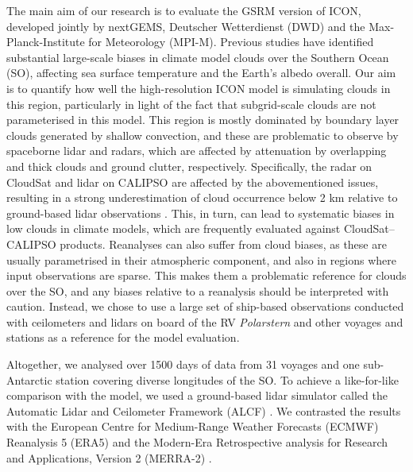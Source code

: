\documentclass[12pt,a4paper]{article}
\begin{document}
The main aim of our research is to evaluate the GSRM version of ICON, developed
jointly by nextGEMS, Deutscher Wetterdienst (DWD) and the Max-Planck-Institute
for Meteorology (MPI-M). Previous studies have identified substantial
large-scale biases in climate model clouds over the Southern Ocean (SO),
affecting sea surface temperature and the Earth’s albedo overall. Our aim is to
quantify how well the high-resolution ICON model is simulating clouds in this
region, particularly in light of the fact that subgrid-scale clouds are not
parameterised in this model. This region is mostly dominated by boundary layer
clouds generated by shallow convection, and these are problematic to observe by
spaceborne lidar and radars, which are affected by attenuation by overlapping
and thick clouds and ground clutter, respectively.  Specifically, the radar on
CloudSat and lidar on CALIPSO are affected by the abovementioned issues,
resulting in a strong underestimation of cloud occurrence below 2 km relative
to ground-based lidar observations \citep{mcerlich2021}.  This, in turn, can
lead to systematic biases in low clouds in climate models, which are frequently
evaluated against CloudSat--CALIPSO products. Reanalyses can also suffer from
cloud biases, as these are usually parametrised in their atmospheric component,
and also in regions where input observations are sparse.  This makes them a
problematic reference for clouds over the SO, and any biases relative to a
reanalysis should be interpreted with caution. Instead, we chose to use a large
set of ship-based observations conducted with ceilometers and lidars on board
of the RV \emph{Polarstern} and other voyages and stations as a reference for
the model evaluation.

Altogether, we analysed over 1500 days of data from 31 voyages and one
sub-Antarctic station covering diverse longitudes of the SO. To achieve a
like-for-like comparison with the model, we used a ground-based lidar simulator
called the Automatic Lidar and Ceilometer Framework (ALCF) \citep{kuma2021}. We
contrasted the results with the European Centre for Medium-Range Weather
Forecasts (ECMWF) Reanalysis 5 (ERA5) \citep{era5} and the Modern-Era
Retrospective analysis for Research and Applications, Version 2 (MERRA-2)
\citep{gelaro2017}.
\end{document}
